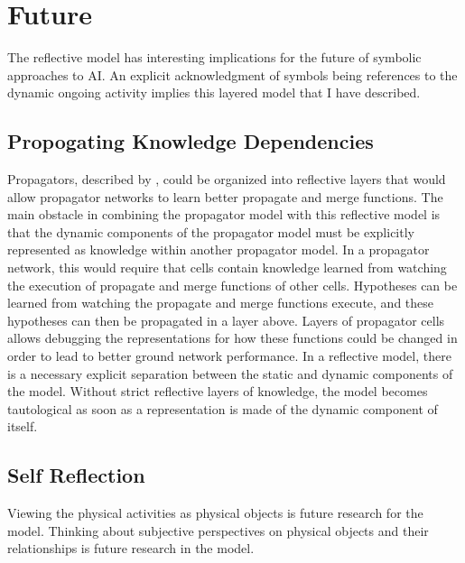 \chapter{Future}\label{chapter:future}

The reflective model has interesting implications for the future of
symbolic approaches to AI.  An explicit acknowledgment of symbols
being references to the dynamic ongoing activity implies this layered
model that I have described.

\section{Propogating Knowledge Dependencies}

Propagators, described by \cite{radul_and_sussman:2009}, could be
organized into reflective layers that would allow propagator networks
to learn better propagate and merge functions.  The main obstacle in
combining the propagator model with this reflective model is that the
dynamic components of the propagator model must be explicitly
represented as knowledge within another propagator model.  In a
propagator network, this would require that cells contain knowledge
learned from watching the execution of propagate and merge functions
of other cells.  Hypotheses can be learned from watching the propagate
and merge functions execute, and these hypotheses can then be
propagated in a layer above.  Layers of propagator cells allows
debugging the representations for how these functions could be changed
in order to lead to better ground network performance.  In a
reflective model, there is a necessary explicit separation between the
static and dynamic components of the model.  Without strict reflective
layers of knowledge, the model becomes tautological as soon as a
representation is made of the dynamic component of itself.

\section{Self Reflection}
\label{section:objective_reflection}

Viewing the physical activities as physical objects is future research
for the model.  Thinking about subjective perspectives on physical
objects and their relationships is future research in the model.

